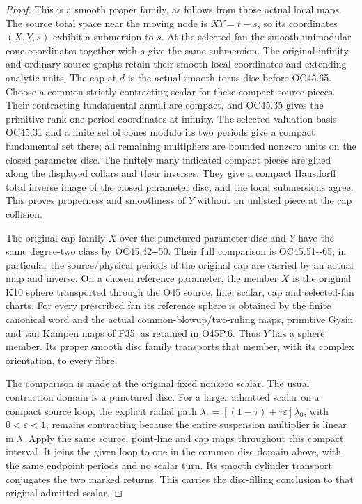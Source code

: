 \begin{proof}
This is a smooth proper family, as follows from those
actual local maps. The source total space near the moving
node is \(XY=t-s\), so its coordinates \((X,Y,s)\)
exhibit a submersion to \(s\). At the selected fan the
smooth unimodular cone coordinates together with \(s\)
give the same submersion. The original infinity and
ordinary source graphs retain their smooth local
coordinates and extending analytic units. The cap at
\(d\) is the actual smooth torus disc before OC45.65.
Choose a common strictly contracting scalar for these
compact source pieces. Their contracting fundamental
annuli are compact, and OC45.35 gives the primitive
rank-one period coordinates at infinity. The selected
valuation basis OC45.31 and a finite set of cones
modulo its two periods give a compact fundamental
set there; all remaining multipliers are bounded
nonzero units on the closed parameter disc.
The finitely many indicated compact pieces are glued
along the displayed collars and their inverses.
They give a compact Hausdorff total inverse image of
the closed parameter disc, and the local submersions
agree. This proves properness and smoothness of \(Y\)
without an unlisted piece at the cap collision.

The original cap family \(X\) over the punctured parameter
disc and \(Y\) have the same degree-two class by
OC45.42-\/-50. Their full comparison is OC45.51-\/-65;
in particular the source/physical periods of the original
cap are carried by an actual map and inverse. On a chosen
reference parameter, the member \(X\) is the original
K10 sphere transported through the O45 source, line,
scalar, cap and selected-fan charts. For every prescribed
fan its reference sphere is obtained by the finite
canonical word and the actual common-blowup/two-ruling
maps, primitive Gysin and van Kampen maps of F35,
as retained in O45P.6. Thus \(Y\) has a sphere member.
Its proper smooth disc family transports that member,
with its complex orientation, to every fibre.

The comparison is made at the original fixed nonzero
scalar. The usual contraction domain is a punctured disc.
For a larger admitted scalar on a compact source loop,
the explicit radial path
\(\lambda_\tau=[(1-\tau)+\tau\varepsilon]\lambda_0\),
with \(0<\varepsilon<1\), remains contracting because
the entire suspension multiplier is linear in \(\lambda\).
Apply the same source, point-line and cap maps throughout
this compact interval. It joins the given loop to one
in the common disc domain above, with the same endpoint
periods and no scalar turn. Its smooth cylinder transport
conjugates the two marked returns. This carries the
disc-filling conclusion to that original admitted scalar.


\end{proof}
